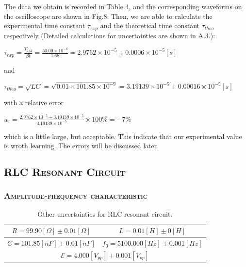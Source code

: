 \documentclass[a4paper,12pt]{article}
\begin{document}
The data we obtain is recorded in Table 4, and the corresponding waveforms on the oscilloscope are shown in Fig.8. Then, we are able to calculate the experimental time constant $\tau_{exp}$ and the theoretical time constant $\tau_{theo}$ respectively (Detailed calculations for uncertainties are shown in A.3.):
\begin{center}
$\displaystyle \tau_{exp} = \frac{T_{1/2}}{\beta t} = \frac{50.00\times 10^{-6}}{1.68} = 2.9762 \times 10^{-5} \pm 0.0006 \times 10^{-5} [s]$
\end{center}
and
\begin{center}
$\displaystyle \tau_{theo} = \sqrt{LC} = \sqrt{0.01\times 101.85 \times 10^{-9}} =  3.19139 \times 10^{-5} \pm 0.00016 \times 10^{-5} [s] $
\end{center}
with a relative error 
\begin{center}
$\displaystyle u_\tau = \frac{2.9762 \times 10^{-5} - 3.19139 \times 10^{-5}}{3.19139 \times 10^{-5}} \times 100\% = -7\% $ 
\end{center}
which is a little large, but acceptable. This indicate that our experimental value is wroth learning. The errors will be discussed later.

\subsection{\textsc{RLC Resonant Circuit}}
\subsubsection{\textsc{Amplitude-frequency characteristic}}

\begin{table}[htbb]
\begin{center}
\begin{tabular}{|c|c|}
\hline
$ R = 99.90 [\Omega] \pm 0.01 [\Omega] $      & $L = 0.01 [H]\pm 0 [H]$                    \\ \hline
$ C = 101.85 [nF] \pm 0.01 [nF] $             & $ f_0 = 5100.000[Hz] \pm 0.001 [Hz] $      \\ \hline
\multicolumn{2}{|c|}{$ \mathcal{E}  = 4.000 [V_{pp}] \pm 0.001[V_{pp}] $}                   \\ \hline
\end{tabular}
\caption{Other uncertainties for RLC resonant circuit.}
\end{center}
\end{table}
\end{document}
